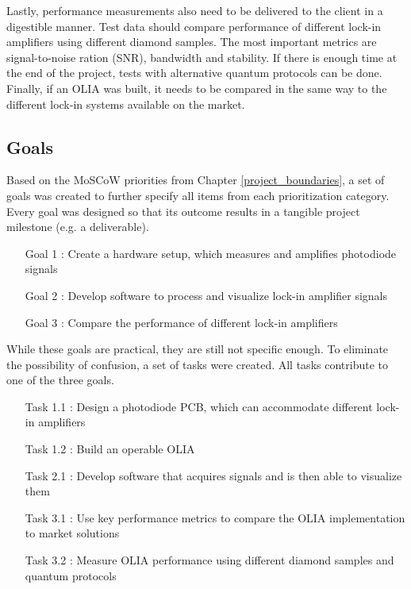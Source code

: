 \documentclass{report}
\begin{document}
	Lastly, performance measurements also need to be delivered to the client in a digestible manner. Test data should compare performance of different lock-in amplifiers using different diamond samples. The most important metrics are signal-to-noise ration (SNR), bandwidth and stability. If there is enough time at the end of the project, tests with alternative quantum protocols can be done. Finally, if an OLIA was built, it needs to be compared in the same way to the different lock-in systems available on the market.
	
	\subsection{Goals} \label{chap:goals}
	Based on the MoSCoW priorities from Chapter \ref{project_boundaries}, a set of goals was created to further specify all items from each prioritization category. Every goal was designed so that its outcome results in a tangible project milestone (e.g. a deliverable).
	
	\begin{itemize}
		\item[Goal 1]: Create a hardware setup, which measures and amplifies photodiode signals
		\item[Goal 2]: Develop software to process and visualize lock-in amplifier signals
		\item[Goal 3]: Compare the performance of different lock-in amplifiers
	\end{itemize}
	
	While these goals are practical, they are still not specific enough. To eliminate the possibility of confusion, a set of tasks were created. All tasks contribute to one of the three goals.
	
	\begin{itemize}
		\item[Task 1.1]: Design a photodiode PCB, which can accommodate different lock-in amplifiers
		\item[Task 1.2]: Build an operable OLIA
		\item[Task 2.1]: Develop software that acquires signals and is then able to visualize them
		\item[Task 3.1]: Use key performance metrics to compare the OLIA implementation to market solutions
		\item[Task 3.2]: Measure OLIA performance using different diamond samples and quantum protocols
	\end{itemize}
	
\end{document}
